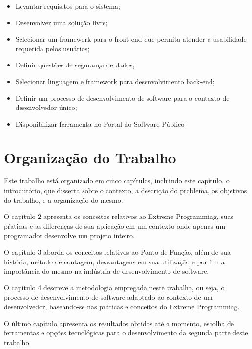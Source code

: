 \begin{itemize}

  \item Levantar requisitos para o sistema;

  \item Desenvolver uma solução livre;

  \item Selecionar um framework para o front-end que permita atender a usabilidade requerida pelos usuários;

  \item  Definir questões de segurança de dados;

  \item Selecionar linguagem e framework para desenvolvimento back-end;

  \item Definir um processo de desenvolvimento de software para o contexto de
  desenvolvedor único;

  \item Disponibilizar ferramenta no Portal do Software Público

\end{itemize}

\section{Organização do Trabalho}

Este trabalho está organizado em cinco capítulos, incluindo este capítulo, o
introdutório, que disserta sobre o contexto, a descrição do problema, os
objetivos do trabalho, e a organização do mesmo.

O capítulo 2 apresenta os conceitos relativos ao Extreme Programming, suas
pŕaticas e as diferenças de sua aplicação em um contexto onde apenas um
programador desenvolve um projeto inteiro.

O capítulo 3 aborda os conceitos relativos ao Ponto de Função, além de sua história, método de contagem, desvantagens em sua utilização e por fim  a
importância do mesmo na indústria de desenvolvimento de software.

O capítulo 4 descreve a metodologia empregada neste trabalho, ou seja,
o processo de desenvolvimento de software adaptado ao contexto de um
desenvolvedor, baseando-se nas práticas e conceitos do Extreme Programming.

O último capítulo apresenta os resultados obtidos até o momento, escolha de
ferramentas e opções tecnológicas para o desenvolvimento da segunda parte deste
trabalho.
